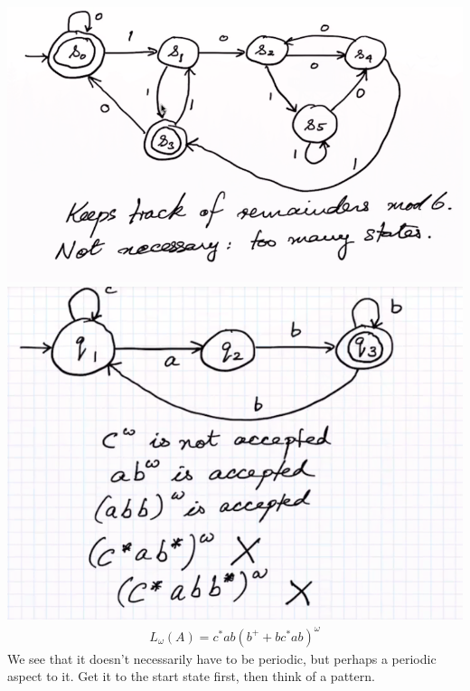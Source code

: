 \documentclass[../598comp.tex]{subfiles}
\begin{document}
\begin{example}
  \includegraphics[width=\textwidth]{mod6machine}
  \includegraphics[width=\textwidth]{omega_regular_language}
  \begin{gather*}
    L_\omega(A) = c^*ab(b^+ + bc^*ab)^\omega
  \end{gather*}
  We see that it doesn't necessarily have to be periodic, but perhaps a periodic
  aspect to it. Get it to the start state first, then think of a pattern.
\end{example}
\end{document}
